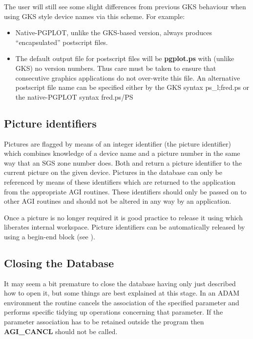 \documentclass[twoside,11pt,nolof]{starlink}
\begin{document}
The user will still see some slight differences from previous GKS behaviour
when using GKS style device names via this scheme. For example:
\begin{itemize}
\item Native-PGPLOT, unlike the GKS-based version, always produces
``encapsulated'' postscript files.
\item The default output file for postscript files will be \textbf{pgplot.ps}
with (unlike GKS) no version numbers.  Thus care must be taken to ensure
that consecutive graphics applications do not over-write this file. An
alternative postscript file name can be specified either by the GKS
syntax ps\_l;fred.ps or the native-PGPLOT syntax fred.ps/PS
\end{itemize}

\subsection{Picture identifiers}

Pictures are flagged by means of an integer identifier (the picture
identifier) which combines knowledge of a device name and a picture
number in the same way that an SGS zone number does. Both
and
return a picture identifier to the current picture on
the given device. Pictures in the database can only be referenced by means
of these identifiers which are returned to the application from the
appropriate AGI routines. These identifiers should only be passed on to
other AGI routines and should not be altered in any way by an application.

Once a picture is no longer required it is good practice to release it using
 which liberates internal workspace. Picture identifiers
can be automatically released by using a begin-end block (see
).

\subsection{Closing the Database}

It may seem a bit premature to close the database having only just
described how to open it, but some things are best explained at this stage.
In an ADAM environment the routine
 cancels the
association of the specified parameter and performs specific tidying
up operations concerning that parameter. If the parameter association
has to be retained outside the program then \textbf{AGI\_CANCL} should not
be called.
\end{document}
